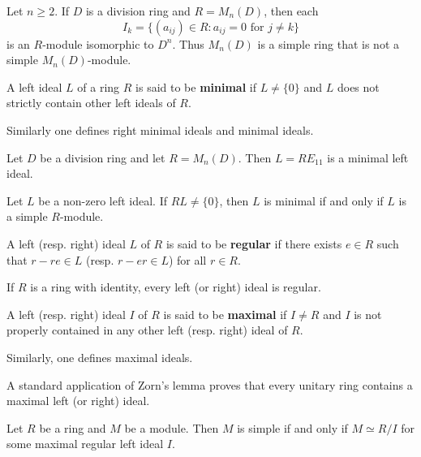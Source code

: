 \begin{example}
	\label{exa:I_k}
	Let $n\geq2$.  If $D$ is a division ring and $R=M_n(D)$, then each 
	\[
	I_k=\{ (a_{ij})\in R:a_{ij}=0\text{ for $j\ne k$}\}
	\]
	is an $R$-module isomorphic to $D^n$. 
	Thus $M_{n}(D)$ is a simple ring that is not a simple $M_n(D)$-module.
\end{example}

\begin{definition}
A left ideal $L$ of a ring $R$ is said to be \textbf{minimal} if $L\ne\{0\}$ and 
$L$ does not strictly contain other left ideals of $R$. 
\end{definition}

Similarly one defines
right minimal ideals and minimal ideals. 

\begin{example}
	Let $D$ be a division ring and let $R=M_n(D)$. Then $L=RE_{11}$ 
	is a minimal left ideal.
\end{example}

\begin{example}
	Let $L$ be a non-zero left ideal. If $RL\ne\{0\}$, then
	$L$ is minimal if and only if $L$ is a simple $R$-module. 
\end{example}

\begin{definition}
A left (resp. right) ideal $L$ of $R$ is said to be \textbf{regular} if
there exists $e\in R$ such that $r-re\in L$ (resp.  $r-er\in L$) for all $r\in R$.
\end{definition}

If $R$ is a ring with identity, every left (or right) ideal is regular. 

\begin{definition}
A left (resp. right) ideal $I$ of $R$ is said to be \textbf{maximal} if $I\ne R$ and $I$ is not properly contained 
in any other left (resp. right) ideal of $R$. 
\end{definition}

Similarly, one defines maximal ideals. 

A standard application of Zorn's lemma proves 
that every unitary ring contains a maximal left (or right) ideal.  

\begin{proposition}
	\label{proposition:R/I}
	Let $R$ be a ring and $M$ be a module. Then $M$ is simple if and only if
	$M\simeq R/I$ for some maximal regular left ideal $I$. 	
\end{proposition}

